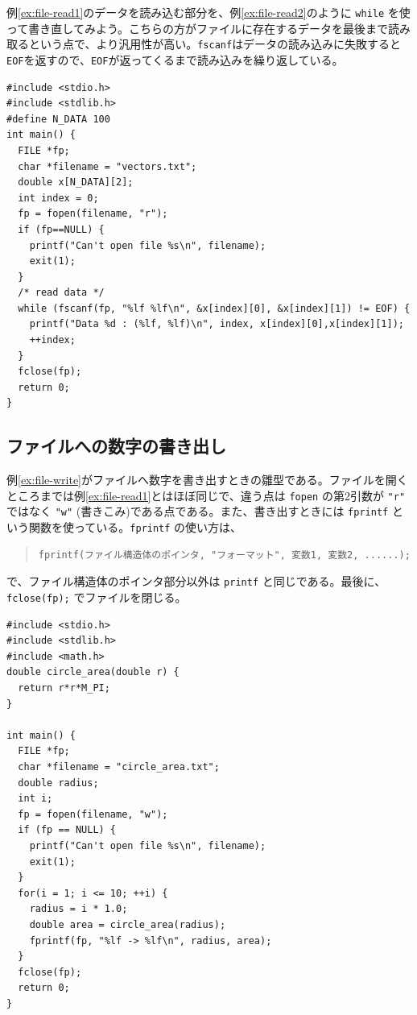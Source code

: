 例\ref{ex:file-read1}のデータを読み込む部分を、例\ref{ex:file-read2}のように \verb|while| を使って書き直してみよう。こちらの方がファイルに存在するデータを最後まで読み取るという点で、より汎用性が高い。\verb|fscanf|はデータの読み込みに失敗すると\verb|EOF|を返すので、\verb|EOF|が返ってくるまで読み込みを繰り返している。
\begin{reidai}\label{ex:file-read2}
\begin{verbatim}
#include <stdio.h>
#include <stdlib.h>
#define N_DATA 100
int main() {
  FILE *fp;
  char *filename = "vectors.txt";
  double x[N_DATA][2];
  int index = 0;
  fp = fopen(filename, "r");
  if (fp==NULL) {
    printf("Can't open file %s\n", filename);
    exit(1);
  }
  /* read data */
  while (fscanf(fp, "%lf %lf\n", &x[index][0], &x[index][1]) != EOF) {
    printf("Data %d : (%lf, %lf)\n", index, x[index][0],x[index][1]);
    ++index;
  }
  fclose(fp);
  return 0;
}
\end{verbatim}
\end{reidai}

\subsection{ファイルへの数字の書き出し}

例\ref{ex:file-write}がファイルへ数字を書き出すときの雛型である。ファイルを開くところまでは例\ref{ex:file-read1}とはほぼ同じで、違う点は \verb|fopen| の第2引数が \verb|"r"| ではなく \verb|"w"| (書きこみ)である点である。また、書き出すときには \verb|fprintf| という関数を使っている。\verb|fprintf| の使い方は、
\begin{quote}
\begin{verbatim}
fprintf(ファイル構造体のポインタ, "フォーマット", 変数1, 変数2, ......);
\end{verbatim}
\end{quote}
で、ファイル構造体のポインタ部分以外は \verb|printf| と同じである。最後に、\verb|fclose(fp);| でファイルを閉じる。
\begin{reidai}\label{ex:file-write}
\begin{verbatim}
#include <stdio.h>
#include <stdlib.h>
#include <math.h>
double circle_area(double r) {
  return r*r*M_PI;
}

int main() {
  FILE *fp;
  char *filename = "circle_area.txt";
  double radius;
  int i;
  fp = fopen(filename, "w");
  if (fp == NULL) {
    printf("Can't open file %s\n", filename);
    exit(1);
  }
  for(i = 1; i <= 10; ++i) {
    radius = i * 1.0;
    double area = circle_area(radius);
    fprintf(fp, "%lf -> %lf\n", radius, area);
  }
  fclose(fp);
  return 0;
}
\end{verbatim}
\end{reidai}

